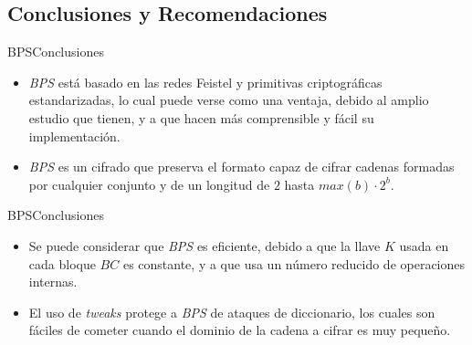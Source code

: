%
%

\subsection{Conclusiones y Recomendaciones}

\begin{frame}{BPS}{Conclusiones}

  \begin{itemize}
    \item \textit{BPS} está basado en las redes Feistel y primitivas 
      criptográficas estandarizadas, lo cual puede verse como una ventaja, 
      debido al amplio estudio que tienen, y a que hacen más comprensible 
      y fácil su implementación.
    
    \item \textit{BPS} es un cifrado que preserva el formato capaz de cifrar 
      cadenas formadas por cualquier conjunto y de un longitud de $2$ hasta 
      $max(b) \cdot 2^{b}$.
  \end{itemize}
  
\end{frame}

\begin{frame}{BPS}{Conclusiones}

  \begin{itemize}
    \item Se puede considerar que \textit{BPS} es eficiente, debido a que la 
      llave $K$ usada en cada bloque $BC$ es constante, y a que usa un número 
      reducido de operaciones internas.
    
    \item El uso de \textit{tweaks} protege a \textit{BPS} de ataques de
      diccionario, los cuales son fáciles de cometer cuando el dominio de la
      cadena a cifrar es muy pequeño.
  \end{itemize}
  
\end{frame}

